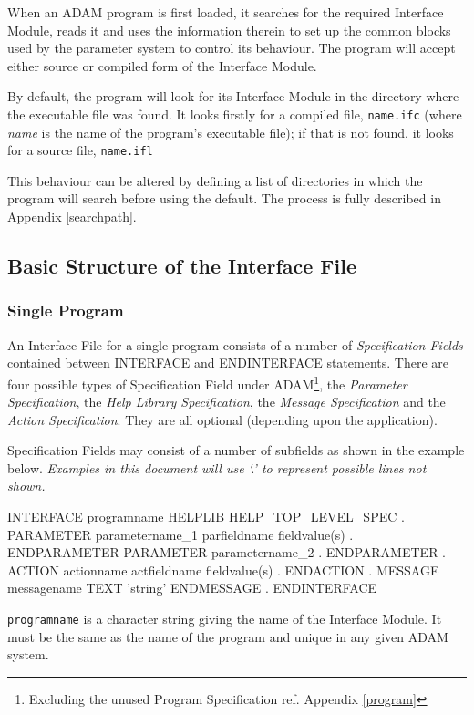 \documentclass[twoside,11pt,nolof]{starlink}
\begin{document}
When an ADAM program is first loaded, it searches for the required
Interface Module, reads it and uses the information therein to set up the
common blocks used by the parameter system to control its behaviour.
The program will accept either source or compiled form of the Interface Module.

By default, the program will look for its Interface Module in the directory
where the executable file was found. It looks firstly for a compiled file,
\texttt{name.ifc} (where \emph{name} is the name of the program's executable
file); if that is not found, it looks for a source file, \texttt{name.ifl}

This behaviour can be altered by defining a list of directories in which
the program will search before using the default.
The process is fully described in Appendix \ref{searchpath}.

\subsection{Basic Structure of the Interface File
}

\subsubsection{Single Program}

An Interface File for a single program consists of a number of \emph{Specification Fields} contained between INTERFACE and ENDINTERFACE
statements.
There are four possible types of
Specification Field under ADAM\footnote{Excluding the unused Program
Specification ref. Appendix \ref{program}}, the \emph{Parameter
Specification}\/, the \emph{Help Library Specification}\/, the \emph{Message
Specification}\/ and the \emph{Action Specification}.
They are all optional (depending upon the application).

Specification Fields may consist of a number of subfields as shown in the
example below.
\emph{Examples in this document will use `.' to represent possible lines not
shown.}
\begin{terminalv}
INTERFACE programname
   HELPLIB     HELP_TOP_LEVEL_SPEC
        .
   PARAMETER   parametername_1
      parfieldname   fieldvalue(s)
            .
   ENDPARAMETER
   PARAMETER   parametername_2
            .
   ENDPARAMETER
         .
   ACTION      actionname
      actfieldname   fieldvalue(s)
            .
   ENDACTION
         .
   MESSAGE     messagename
      TEXT     'string'
   ENDMESSAGE
      .
ENDINTERFACE
\end{terminalv}
\texttt{programname} is a character string giving the name of the Interface
Module.
It must be the same as the name of the program and unique in any given ADAM
system.
\end{document}
